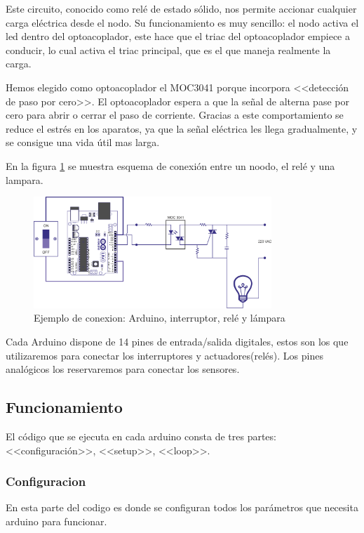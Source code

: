  Este circuito, conocido como relé de estado sólido, nos permite accionar cualquier carga eléctrica desde el nodo. Su funcionamiento es muy sencillo: el nodo activa el led dentro del optoacoplador, este hace que el triac del optoacoplador empiece a conducir, lo cual activa el triac principal, que es el que maneja realmente la carga. 
 
 Hemos elegido como optoacoplador el MOC3041 porque incorpora <<detección de paso por cero>>. El optoacoplador espera a que la señal de  alterna pase por cero para abrir o cerrar el paso de corriente. Gracias a este comportamiento se reduce el estrés en los aparatos, ya que la señal eléctrica les llega gradualmente, y se consigue una vida útil mas larga.
  
En la figura \ref{fig:ard_int_lamp} se muestra esquema de conexión entre un noodo, el relé y una lampara.

\begin{figure}[htb]
    \centering
    \includegraphics[width=0.8\textwidth]{imagenes/arduino_lampara.png}
    \caption{Ejemplo de conexion: Arduino, interruptor, relé y lámpara}
    \label{fig:ard_int_lamp}
\end{figure}

Cada Arduino dispone de 14 pines de entrada/salida digitales, estos son los que utilizaremos para conectar los interruptores y actuadores(relés). Los pines analógicos los reservaremos para conectar los sensores.

\subsection{Funcionamiento}

El código que se ejecuta en cada arduino consta de tres partes: <<configuración>>, <<setup>>, <<loop>>.
\subsubsection{Configuracion}
En esta parte del codigo es donde se configuran todos los parámetros que necesita arduino para funcionar.

